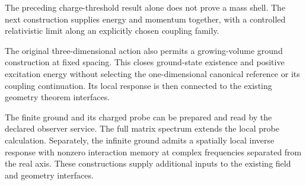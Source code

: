 {}
{}

{}
{}

The preceding charge-threshold result alone does not prove a mass shell.
The next construction supplies energy and momentum together, with a
controlled relativistic limit along an explicitly chosen coupling family.

{}
{}

The original three-dimensional action also permits a growing-volume
ground construction at fixed spacing. This closes ground-state existence
and positive excitation energy without selecting the one-dimensional
canonical reference or its coupling continuation. Its local response is
then connected to the existing geometry theorem interfaces.

{}
{}

{}
{}

The finite ground and its charged probe can be prepared and read by
the declared observer service. The full matrix spectrum extends the local
probe calculation. Separately, the infinite ground admits a spatially
local inverse response with nonzero interaction memory at complex
frequencies separated from the real axis. These constructions supply
additional inputs to the existing field and geometry interfaces.

{}
{}

{}
{}

{}
{}

